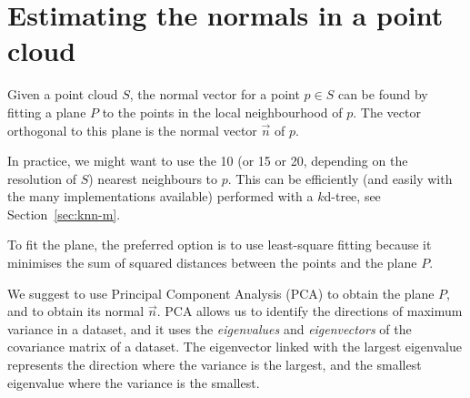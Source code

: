 
\graphicspath{{appendices/normalplane/figs/}}

\chapter{Estimating the normals in a point cloud}%
\label{app:normalplane}


Given a point cloud $S$, the normal vector for a point $p \in S$ can be found by fitting a plane $P$ to the points in the local neighbourhood of $p$. 
The vector orthogonal to this plane is the normal vector $\vec{n}$ of $p$.

In practice, we might want to use the 10 (or 15 or 20, depending on the resolution of $S$) nearest neighbours to $p$.
This can be efficiently (and easily with the many implementations available) performed with a $k$d-tree, see Section~\ref{sec:knn-m}.

To fit the plane, the preferred option is to use least-square fitting because it minimises the sum of squared distances between the points and the plane $P$.

We suggest to use Principal Component Analysis (PCA) 
%
to obtain the plane $P$, and to obtain its normal $\vec{n}$.
PCA allows us to identify the directions of maximum variance in a dataset, and it uses the \emph{eigenvalues} and \emph{eigenvectors} of the covariance matrix of a dataset.
%
The eigenvector linked with the largest eigenvalue represents the direction where the variance is the largest, and the smallest eigenvalue where the variance is the smallest.


